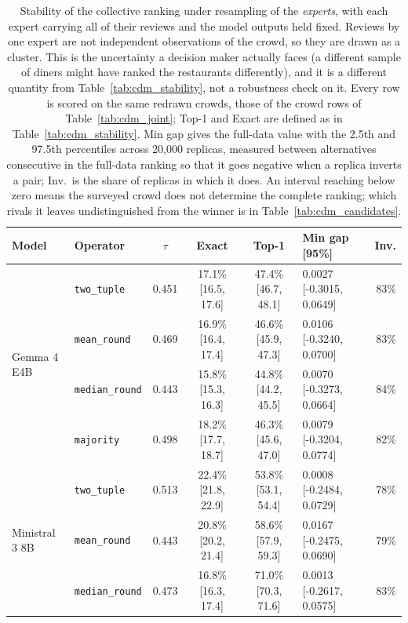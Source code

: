 \begin{table}[htbp]
\centering
\caption{Stability of the collective ranking under resampling of the \emph{experts}, with each expert carrying all of their reviews and the model outputs held fixed. Reviews by one expert are not independent observations of the crowd, so they are drawn as a cluster. This is the uncertainty a decision maker actually faces (a different sample of diners might have ranked the restaurants differently), and it is a different quantity from Table~\ref{tab:cdm_stability}, not a robustness check on it. Every row is scored on the same redrawn crowds, those of the crowd rows of Table~\ref{tab:cdm_joint}; Top-1 and Exact are defined as in Table~\ref{tab:cdm_stability}. Min gap gives the full-data value with the 2.5th and 97.5th percentiles across 20{,}000 replicas, measured between alternatives consecutive in the full-data ranking so that it goes negative when a replica inverts a pair; Inv.\ is the share of replicas in which it does. An interval reaching below zero means the surveyed crowd does not determine the complete ranking; which rivals it leaves undistinguished from the winner is in Table~\ref{tab:cdm_candidates}.}
\label{tab:cdm_crowd}
\small
\begin{tabular}{llccclr}
\toprule
\textbf{Model} & \textbf{Operator} & \textbf{$\tau$} & \textbf{Exact} & \textbf{Top-1} & \textbf{Min gap [95\%]} & \textbf{Inv.} \\
\midrule
  \multirow{4}{*}{Gemma 4 E4B} & \texttt{two\_tuple} & 0.451 & 17.1\% \tiny[16.5, 17.6] & 47.4\% \tiny[46.7, 48.1] & 0.0027 [-0.3015, 0.0649] & 83\% \\
   & \texttt{mean\_round} & 0.469 & 16.9\% \tiny[16.4, 17.4] & 46.6\% \tiny[45.9, 47.3] & 0.0106 [-0.3240, 0.0700] & 83\% \\
   & \texttt{median\_round} & 0.443 & 15.8\% \tiny[15.3, 16.3] & 44.8\% \tiny[44.2, 45.5] & 0.0070 [-0.3273, 0.0664] & 84\% \\
   & \texttt{majority} & 0.498 & 18.2\% \tiny[17.7, 18.7] & 46.3\% \tiny[45.6, 47.0] & 0.0079 [-0.3204, 0.0774] & 82\% \\
\midrule
  \multirow{4}{*}{Ministral 3 8B} & \texttt{two\_tuple} & 0.513 & 22.4\% \tiny[21.8, 22.9] & 53.8\% \tiny[53.1, 54.4] & 0.0008 [-0.2484, 0.0729] & 78\% \\
   & \texttt{mean\_round} & 0.443 & 20.8\% \tiny[20.2, 21.4] & 58.6\% \tiny[57.9, 59.3] & 0.0167 [-0.2475, 0.0690] & 79\% \\
   & \texttt{median\_round} & 0.473 & 16.8\% \tiny[16.3, 17.4] & 71.0\% \tiny[70.3, 71.6] & 0.0013 [-0.2617, 0.0575] & 83\% \\

\end{tabular}
\end{table}
